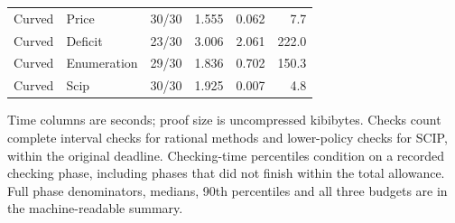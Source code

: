 \documentclass[11pt,letterpaper]{article}
\theoremstyle{definition}\newtheorem{remark}[theorem]{Remark}
\begin{document}
\begin{table}[p]
\begin{tabular}{llrrrr}
Curved & Price & 30/30 & 1.555 & 0.062 & 7.7\\
Curved & Deficit & 23/30 & 3.006 & 2.061 & 222.0\\
Curved & Enumeration & 29/30 & 1.836 & 0.702 & 150.3\\
Curved & Scip & 30/30 & 1.925 & 0.007 & 4.8\\
\bottomrule\end{tabular}\par\smallskip\begin{minipage}{\textwidth}\small Time columns are seconds; proof size is uncompressed kibibytes. Checks count complete interval checks for rational methods and lower-policy checks for SCIP, within the original deadline. Checking-time percentiles condition on a recorded checking phase, including phases that did not finish within the total allowance. Full phase denominators, medians, 90th percentiles and all three budgets are in the machine-readable summary.\end{minipage}\end{table}
\end{document}
